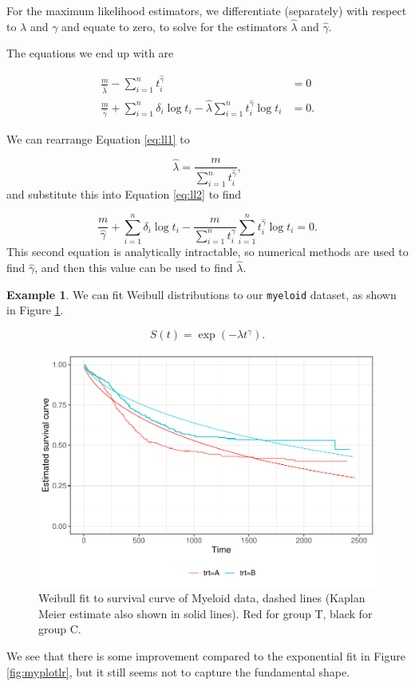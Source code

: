 \documentclass[
  openany]{book}
\theoremstyle{definition}
\theoremstyle{definition}
\newtheorem{example}{Example}[chapter]
\theoremstyle{definition}
\theoremstyle{definition}
\theoremstyle{remark}
\begin{document}
For the maximum likelihood estimators, we differentiate (separately) with respect to \(\lambda\) and \(\gamma\) and equate to zero, to solve for the estimators \(\hat\lambda\) and \(\hat\gamma\).

The equations we end up with are

\begin{align}
\frac{m}{\hat{\lambda}} - \sum\limits_{i=1}^n t_i^{\hat\gamma} & = 0 \label{eq:ll1}\\
\frac{m}{\hat{\gamma}} + \sum\limits_{i=1}^n \delta_i\log t_i - \hat{\lambda}\sum\limits_{i=1}^n t_i^{\hat\gamma} \log t_i &=0 \label{eq:ll2}.
\end{align}

We can rearrange Equation \eqref{eq:ll1} to

\[\hat{\lambda} = \frac{m}{\sum\limits_{i=1}^n t_i^{\hat\gamma}},\]
and substitute this into Equation \eqref{eq:ll2} to find

\[\frac{m}{\hat{\gamma}} + \sum\limits_{i=1}^n \delta_i\log t_i - \frac{m}{\sum\limits_{i=1}^n t_i^{\gamma}}\sum\limits_{i=1}^n t_i^{\hat\gamma} \log t_i=0. \]
This second equation is analytically intractable, so numerical methods are used to find \(\hat\gamma\), and then this value can be used to find \(\hat\lambda\).

\begin{example}
We can fit Weibull distributions to our \texttt{myeloid} dataset, as shown in Figure \ref{fig:weibmy}.

\[S\left(t\right) = \exp\left(-\lambda t^{\gamma}\right).\]

\begin{figure}
\centering
\includegraphics{CT4H_notes_files/figure-latex/weibmy-1.pdf}
\caption{\label{fig:weibmy}Weibull fit to survival curve of Myeloid data, dashed lines (Kaplan Meier estimate also shown in solid lines). Red for group T, black for group C.}
\end{figure}

We see that there is some improvement compared to the exponential fit in Figure \ref{fig:myplotlr}, but it still seems not to capture the fundamental shape.
\end{example}
\end{document}

